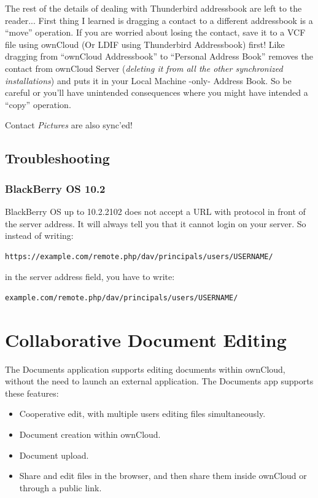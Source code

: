 \documentclass[letterpaper,10pt,english]{sphinxmanual}
\begin{document}
The rest of the details of dealing with Thunderbird addressbook are left to the reader... First thing I learned
is dragging a contact to a different addressbook is a ``move'' operation. If you are worried about losing the
contact, save it to a VCF file using ownCloud (Or LDIF using Thunderbird Addressbook) first! Like dragging
from ``ownCloud Addressbook'' to ``Personal Address Book'' removes the contact from ownCloud Server
(\emph{deleting it from all the other synchronized installations}) and puts it in your Local Machine -only-
Address Book. So be careful or you'll have unintended consequences where you might have intended a ``copy'' operation.

Contact \emph{Pictures} are also sync'ed!


\section{Troubleshooting}
\label{pim/troubleshooting::doc}\label{pim/troubleshooting:troubleshooting}

\subsection{BlackBerry OS 10.2}
\label{pim/troubleshooting:blackberry-os-10-2}
BlackBerry OS up to 10.2.2102 does not accept a URL with protocol 
in front of the server address. It will always tell you that it cannot login on
your server. So instead of writing:

\begin{Verbatim}[commandchars=\\\{\}]
https://example.com/remote.php/dav/principals/users/USERNAME/
\end{Verbatim}

in the server address field, you have to write:

\begin{Verbatim}[commandchars=\\\{\}]
example.com/remote.php/dav/principals/users/USERNAME/
\end{Verbatim}


\chapter{Collaborative Document Editing}
\label{documents:collaborative-document-editing}\label{documents::doc}
The Documents application supports editing documents within ownCloud, without
the need to launch an external application. The Documents app supports these
features:
\begin{itemize}
\item {} 
Cooperative edit, with multiple users editing files simultaneously.

\item {} 
Document creation within ownCloud.

\item {} 
Document upload.

\item {} 
Share and edit files in the browser, and then share them inside ownCloud or
through a public link.

\end{itemize}
\end{document}
